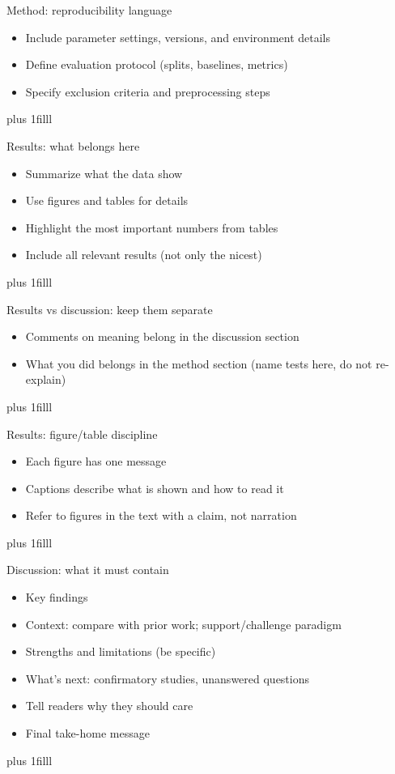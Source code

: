 \documentclass[aspectratio=169]{beamer}
\newcommand{\btVFill}{\vskip0pt plus 1filll}
\begin{document}
\begin{frame}{Method: reproducibility language}
  \begin{itemize}
    \item Include parameter settings, versions, and environment details
    \item Define evaluation protocol (splits, baselines, metrics)
    \item Specify exclusion criteria and preprocessing steps
  \end{itemize}
  \btVFill
\end{frame}

\begin{frame}{Results: what belongs here}
  \begin{itemize}
    \item Summarize what the data show
    \item Use figures and tables for details
    \item Highlight the most important numbers from tables
    \item Include all relevant results (not only the nicest)
  \end{itemize}
  \btVFill
\end{frame}

\begin{frame}{Results vs discussion: keep them separate}
  \begin{itemize}
    \item Comments on meaning belong in the discussion section
    \item What you did belongs in the method section (name tests here, do not re-explain)
  \end{itemize}
\btVFill\end{frame}

\begin{frame}{Results: figure/table discipline}
  \begin{itemize}
    \item Each figure has one message
    \item Captions describe what is shown and how to read it
    \item Refer to figures in the text with a claim, not narration
  \end{itemize}
\btVFill\end{frame}

\begin{frame}{Discussion: what it must contain}
  \begin{itemize}
    \item Key findings
    \item Context: compare with prior work; support/challenge paradigm
    \item Strengths and limitations (be specific)
    \item What's next: confirmatory studies, unanswered questions
    \item Tell readers why they should care
    \item Final take-home message
  \end{itemize}\btVFill
\end{frame}
\end{document}
